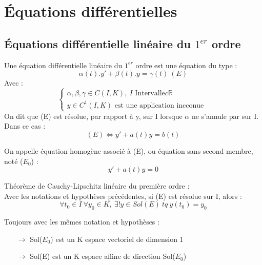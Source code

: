\chapter{Équations différentielles}
\section{Équations différentielle linéaire du $1^{er}$ ordre}
\begin{de}
Une équation différentielle linéaire du $1^{er}$ ordre est une équation du type : 
$$\alpha(t).y' + \beta(t).y = \gamma(t)~ (E)$$
Avec : 
$$\begin{cases}
   \alpha,\beta,\gamma \in C(I,K),~ I \mbox{ Intervalle} c \mathbb{R} \\ 
   y \in C^1(I,K) \mbox{ est une application incconue }
  \end{cases}
$$
On dit que (E) est résolue, par rapport à y, sur I lorsque $\alpha$ ne s'annule par sur I. Dans ce cas : 
$$(E) \Leftrightarrow y' + a(t)y = b(t)$$
\end{de}
\begin{de}
On appelle équation homogène associé à (E), ou équation sans second membre, noté ($E_0$) : 
$$y' + a(t)y = 0$$
\end{de}
\begin{theo}
Théorème de Cauchy-Lipschitz linéaire du première ordre :\\
Avec les notations et hypothèses précédentes, si (E) est résolue sur I, alors : 
$$\forall t_0 \in I~ \forall y_0 \in K,~ \exists! y \in Sol(E) ~ tq~ y(t_0) = y_0$$ 
\end{theo}
\begin{coro}
Toujours avec les mêmes notation et hypothèses : 
\begin{itemize}
 \item[$\rightarrow$] Sol($E_0$) est un K espace vectoriel de dimension 1
 \item[$\rightarrow$] Sol(E) est un K espace affine de direction Sol($E_0$)
\end{itemize}
\end{coro}
